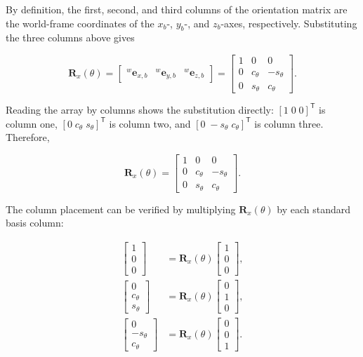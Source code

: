 \documentclass[
  australian,
  12pt,
  letterpaper,
  DIV=11,
  numbers=noendperiod,
  twoside]{scrreprt}
\begin{document}
By definition, the first, second, and third columns of the orientation
matrix are the world-frame coordinates of the \(x_b\)-, \(y_b\)-, and
\(z_b\)-axes, respectively. Substituting the three columns above gives

\[
\mathbf R_x(\theta)
=
\begin{bmatrix}
{}^{w}\mathbf e_{x,b}&
{}^{w}\mathbf e_{y,b}&
{}^{w}\mathbf e_{z,b}
\end{bmatrix}
=
\left[
\begin{array}{c|c|c}
1&0&0\\
0&c_\theta&-s_\theta\\
0&s_\theta&c_\theta
\end{array}
\right].
\]

Reading the array by columns shows the substitution directly:
\([1\;0\;0]^\mathsf T\) is column one,
\([0\;c_\theta\;s_\theta]^\mathsf T\) is column two, and
\([0\;-s_\theta\;c_\theta]^\mathsf T\) is column three. Therefore,

\[
\boxed{
\mathbf R_x(\theta)
=
\begin{bmatrix}
1&0&0\\
0&c_\theta&-s_\theta\\
0&s_\theta&c_\theta
\end{bmatrix}
}.
\]

The column placement can be verified by multiplying
\(\mathbf R_x(\theta)\) by each standard basis column:

\[
\begin{aligned}
\begin{bmatrix}
1\\0\\0
\end{bmatrix}
&=
\mathbf R_x(\theta)
\begin{bmatrix}
1\\0\\0
\end{bmatrix},\\[4pt]
\begin{bmatrix}
0\\c_\theta\\s_\theta
\end{bmatrix}
&=
\mathbf R_x(\theta)
\begin{bmatrix}
0\\1\\0
\end{bmatrix},\\[4pt]
\begin{bmatrix}
0\\-s_\theta\\c_\theta
\end{bmatrix}
&=
\mathbf R_x(\theta)
\begin{bmatrix}
0\\0\\1
\end{bmatrix}.
\end{aligned}
\]
\end{document}
